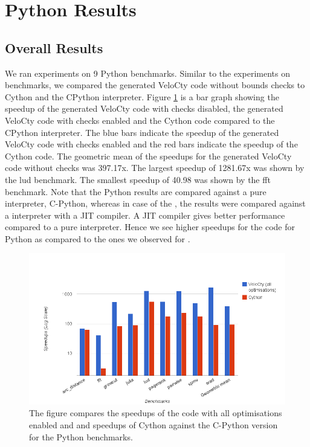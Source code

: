 \section{Python Results}
\subsection{Overall Results}
We ran experiments on 9 Python benchmarks. Similar to the experiments on \matlab benchmarks, we compared the generated VeloCty code without bounds checks to Cython and the CPython interpreter. Figure \ref{fig:results_cwochecks_py} is a bar graph showing the speedup of the generated VeloCty code with checks disabled, the generated VeloCty code with checks enabled and the Cython code compared to the CPython interpreter. The blue bars indicate the speedup of the generated VeloCty code with checks enabled and the red bars indicate the speedup of the Cython code. The geometric mean of the speedups for the generated VeloCty code without checks was 397.17x. The largest speedup of 1281.67x was shown by the \textsf{lud} benchmark. The smallest speedup of 40.98 was shown by the \textsf{fft} benchmark. Note that the Python results are compared against a pure interpreter, C-Python, whereas in case of the \matlab, the results were compared against a interpreter with a JIT compiler. A JIT compiler gives better performance compared to a pure interpreter. Hence we see higher speedups for the \velocty code for Python as compared to the ones we observed for \matlab. 
\begin{figure}[htbp]
\centering
\includegraphics[scale=0.5]{Figures/results_cwochecks_py.png}
\caption{The figure compares the speedups of the \velocty code with all optimisations enabled and and speedups of Cython against the C-Python version for the Python benchmarks.}
\label{fig:results_cwochecks_py}
\end{figure}


